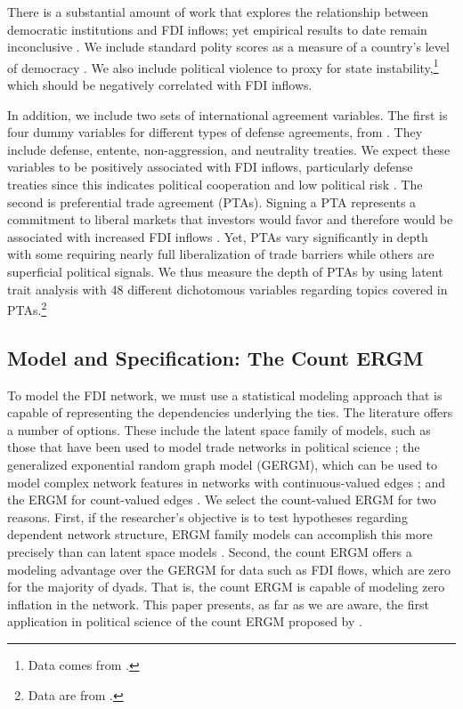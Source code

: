 \documentclass[12pt]{article}
\begin{document}
There is a substantial amount of work that explores the relationship between democratic institutions and FDI inflows; yet empirical results to date remain inconclusive \citep[see e.g.][]{Henisz:2000,Jensen:2003,Li_Resnick:2003,Jakobsen_DeSoysa:2006,Resnick:2001}. We include standard polity scores as a measure of a country's level of democracy \citep{Marshall_Jaggers:2010}. We also include political violence to proxy for state instability,\footnote{Data comes from \citet{marshall2005major}.} which should be negatively correlated with FDI inflows.

In addition, we include two sets of international agreement variables. The first is four dummy variables for different types of defense agreements, from \citet{Gibler09}. They include defense, entente, non-aggression, and neutrality treaties. We expect these variables to be positively associated with FDI inflows, particularly defense treaties since this indicates political cooperation and low political risk \citep{Li_Vashchilko:2010}. The second is preferential trade agreement (PTAs). Signing a PTA represents a commitment to liberal markets that investors would favor and therefore would be associated with increased FDI inflows \citep{Buthe_Milner:2008,buthe2014foreign}. Yet, PTAs vary significantly in depth with some requiring nearly full liberalization of trade barriers while others are superficial political signals. We thus measure the depth of PTAs by using latent trait analysis with 48 different dichotomous variables regarding topics covered in PTAs.\footnote{Data are from \citet{dur2014design}.}

\subsection{Model and Specification: The Count ERGM}

To model the FDI network, we must use a statistical modeling approach that is capable of representing the dependencies underlying the ties. The literature offers a number of options. These include the latent space family of models, such as those that have been used to model trade networks in political science \citep{ward2007persistent,ward2013gravity}; the generalized exponential random graph model (GERGM), which can be used to model complex network features in networks with continuous-valued edges \citep{desmarais2012statistical,wilson2017stochastic}; and the ERGM for count-valued edges \citep{krivitsky2012exponential}. We select the count-valued ERGM for two reasons. First, if the researcher's objective is to test hypotheses regarding dependent network structure, ERGM family models can accomplish this more precisely than can latent space models \citep{cranmer2016navigating,cranmer2016critique,desmarais2017statistical}. Second, the count ERGM offers a modeling advantage over the GERGM for data such as FDI flows, which are zero for the majority of dyads. That is, the count ERGM is capable of modeling zero inflation in the network. This paper presents, as far as we are aware, the first application in political science of the count ERGM proposed by \cite{krivitsky2012exponential}.
\end{document}
